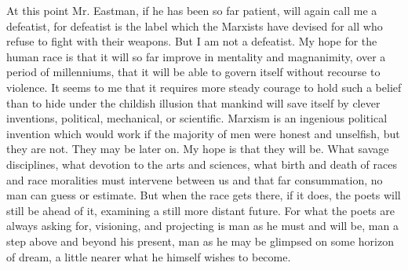 \documentclass[9pt,twoside]{extarticle}
\begin{document}
At this point Mr. Eastman, if he has been so far patient, will again call me a defeatist, for defeatist is the label which the Marxists have devised for all who refuse to fight with their weapons. But I am not a defeatist. My hope for the human race is that it will so far improve in mentality and magnanimity, over a period of millenniums, that it will be able to govern itself without recourse to violence. It seems to me that it requires more steady courage to hold such a belief than to hide under the childish illusion that mankind will save itself by clever inventions, political, mechanical, or scientific. Marxism is an ingenious political invention which would work if the majority of men were honest and unselfish, but they are not. They may be later on. My hope is that they will be. What savage disciplines, what devotion to the arts and sciences, what birth and death of races and race moralities must intervene between us and that far consummation, no man can guess or estimate. But when the race gets there, if it does, the poets will still be ahead of it, examining a still more distant future. For what the poets are always asking for, visioning, and projecting is man as he must and will be, man a step above and beyond his present, man as he may be glimpsed on some horizon of dream, a little nearer what he himself wishes to become.
\end{document}
